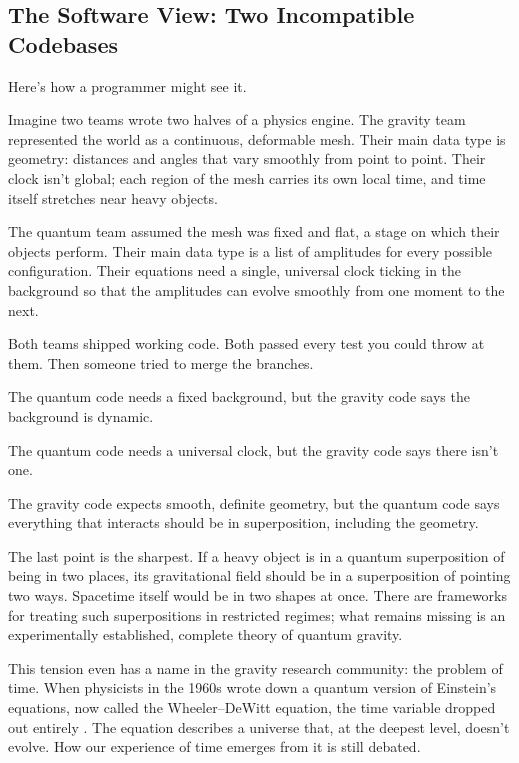 \subsection{The Software View: Two Incompatible Codebases}

Here's how a programmer might see it.

Imagine two teams wrote two halves of a physics engine. The gravity team represented the world as a continuous, deformable mesh. Their main data type is geometry: distances and angles that vary smoothly from point to point. Their clock isn't global; each region of the mesh carries its own local time, and time itself stretches near heavy objects.

The quantum team assumed the mesh was fixed and flat, a stage on which their objects perform. Their main data type is a list of amplitudes for every possible configuration. Their equations need a single, universal clock ticking in the background so that the amplitudes can evolve smoothly from one moment to the next.

Both teams shipped working code. Both passed every test you could throw at them. Then someone tried to merge the branches.

\begin{compactchecklist}
\item The quantum code needs a fixed background, but the gravity code says the background is dynamic.
\item The quantum code needs a universal clock, but the gravity code says there isn't one.
\item The gravity code expects smooth, definite geometry, but the quantum code says everything that interacts should be in superposition, including the geometry.
\end{compactchecklist}

The last point is the sharpest. If a heavy object is in a quantum superposition of being in two places, its gravitational field should be in a superposition of pointing two ways. Spacetime itself would be in two shapes at once. There are frameworks for treating such superpositions in restricted regimes; what remains missing is an experimentally established, complete theory of quantum gravity.

This tension even has a name in the gravity research community: the problem of time. When physicists in the 1960s wrote down a quantum version of Einstein's equations, now called the Wheeler--DeWitt equation, the time variable dropped out entirely \cite{dewitt1967}. The equation describes a universe that, at the deepest level, doesn't evolve. How our experience of time emerges from it is still debated.

